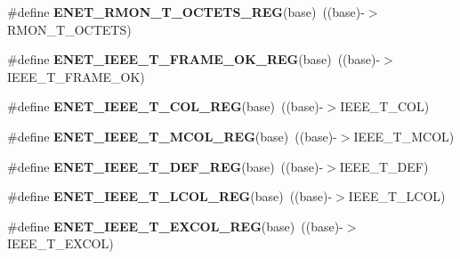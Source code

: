 \begin{DoxyCompactItemize}
\item 
\#define {\bfseries E\+N\+E\+T\+\_\+\+R\+M\+O\+N\+\_\+\+T\+\_\+\+O\+C\+T\+E\+T\+S\+\_\+\+R\+EG}(base)~((base)-\/$>$R\+M\+O\+N\+\_\+\+T\+\_\+\+O\+C\+T\+E\+TS)\hypertarget{group__ENET__Register__Accessor__Macros_ga7886f23c97239dd209b1be39052faae6}{}\label{group__ENET__Register__Accessor__Macros_ga7886f23c97239dd209b1be39052faae6}

\item 
\#define {\bfseries E\+N\+E\+T\+\_\+\+I\+E\+E\+E\+\_\+\+T\+\_\+\+F\+R\+A\+M\+E\+\_\+\+O\+K\+\_\+\+R\+EG}(base)~((base)-\/$>$I\+E\+E\+E\+\_\+\+T\+\_\+\+F\+R\+A\+M\+E\+\_\+\+OK)\hypertarget{group__ENET__Register__Accessor__Macros_ga59cc01d88c2b9f9cdec674e530c4f9a2}{}\label{group__ENET__Register__Accessor__Macros_ga59cc01d88c2b9f9cdec674e530c4f9a2}

\item 
\#define {\bfseries E\+N\+E\+T\+\_\+\+I\+E\+E\+E\+\_\+\+T\+\_\+C\+O\+L\+\_\+\+R\+EG}(base)~((base)-\/$>$I\+E\+E\+E\+\_\+\+T\+\_\+C\+OL)\hypertarget{group__ENET__Register__Accessor__Macros_ga804822cbaf00371d46938d8a469d8c20}{}\label{group__ENET__Register__Accessor__Macros_ga804822cbaf00371d46938d8a469d8c20}

\item 
\#define {\bfseries E\+N\+E\+T\+\_\+\+I\+E\+E\+E\+\_\+\+T\+\_\+\+M\+C\+O\+L\+\_\+\+R\+EG}(base)~((base)-\/$>$I\+E\+E\+E\+\_\+\+T\+\_\+\+M\+C\+OL)\hypertarget{group__ENET__Register__Accessor__Macros_ga0aaac49fdc27a1ab4903f285857782ee}{}\label{group__ENET__Register__Accessor__Macros_ga0aaac49fdc27a1ab4903f285857782ee}

\item 
\#define {\bfseries E\+N\+E\+T\+\_\+\+I\+E\+E\+E\+\_\+\+T\+\_\+\+D\+E\+F\+\_\+\+R\+EG}(base)~((base)-\/$>$I\+E\+E\+E\+\_\+\+T\+\_\+\+D\+EF)\hypertarget{group__ENET__Register__Accessor__Macros_ga1bda43a4f9681420b2904c8a4a237894}{}\label{group__ENET__Register__Accessor__Macros_ga1bda43a4f9681420b2904c8a4a237894}

\item 
\#define {\bfseries E\+N\+E\+T\+\_\+\+I\+E\+E\+E\+\_\+\+T\+\_\+\+L\+C\+O\+L\+\_\+\+R\+EG}(base)~((base)-\/$>$I\+E\+E\+E\+\_\+\+T\+\_\+\+L\+C\+OL)\hypertarget{group__ENET__Register__Accessor__Macros_gacc53cc71e7d2ec19ed5b757cf704afbb}{}\label{group__ENET__Register__Accessor__Macros_gacc53cc71e7d2ec19ed5b757cf704afbb}

\item 
\#define {\bfseries E\+N\+E\+T\+\_\+\+I\+E\+E\+E\+\_\+\+T\+\_\+\+E\+X\+C\+O\+L\+\_\+\+R\+EG}(base)~((base)-\/$>$I\+E\+E\+E\+\_\+\+T\+\_\+\+E\+X\+C\+OL)\hypertarget{group__ENET__Register__Accessor__Macros_ga663c2333e0d9e070c6375664a6484104}{}\label{group__ENET__Register__Accessor__Macros_ga663c2333e0d9e070c6375664a6484104}


\end{DoxyCompactItemize}
